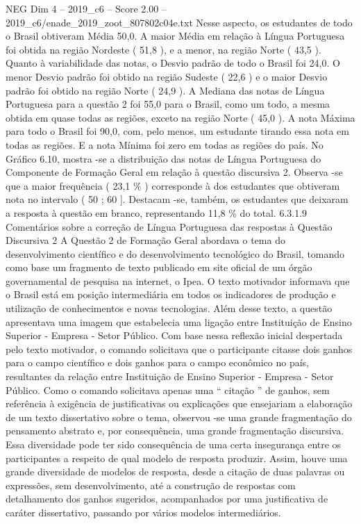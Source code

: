 \begin{textsample}{NEG Dim 4 – 2019\_c6 – Score 2.00 – 2019\_c6/enade\_2019\_zoot\_807802c04e.txt}
Nesse aspecto, os estudantes de todo o Brasil obtiveram Média 50,0.
A maior Média em relação à Língua Portuguesa foi obtida na região Nordeste ( 51,8 ), e a menor, na região Norte ( 43,5 ).
Quanto à variabilidade das notas, o Desvio padrão de todo o Brasil foi 24,0.
O menor Desvio padrão foi obtido na região Sudeste ( 22,6 ) e o maior Desvio padrão foi obtido na região Norte ( 24,9 ).
A Mediana das notas de Língua Portuguesa para a questão 2 foi 55,0 para o Brasil, como um todo, a mesma obtida em quase todas as regiões, exceto na região Norte ( 45,0 ).
A nota Máxima para todo o Brasil foi 90,0, com, pelo menos, um estudante tirando essa nota em todas as regiões.
E a nota Mínima foi zero em todas as regiões do país.
No Gráfico 6.10, mostra -se a distribuição das notas de Língua Portuguesa do Componente de Formação Geral em relação à questão discursiva 2.
Observa -se que a maior frequência ( 23,1 \% ) corresponde à dos estudantes que obtiveram nota no intervalo ( 50 ; 60 ].
Destacam -se, também, os estudantes que deixaram a resposta à questão em branco, representando 11,8 \% do total. 6.3.1.9 Comentários sobre a correção de Língua Portuguesa das respostas à Questão Discursiva 2 A Questão 2 de Formação Geral abordava o tema do desenvolvimento científico e do desenvolvimento tecnológico do Brasil, tomando como base um fragmento de texto publicado em site oficial de um órgão governamental de pesquisa na internet, o Ipea.
O texto motivador informava que o Brasil está em posição intermediária em todos os indicadores de produção e utilização de conhecimentos e novas tecnologias.
Além desse texto, a questão apresentava uma imagem que estabelecia uma ligação entre Instituição de Ensino Superior - Empresa - Setor Público.
Com base nessa reflexão inicial despertada pelo texto motivador, o comando solicitava que o participante citasse dois ganhos para o campo científico e dois ganhos para o campo econômico no país, resultantes da relação entre Instituição de Ensino Superior - Empresa - Setor Público.
Como o comando solicitava apenas uma “ citação ” de ganhos, sem referência à exigência de justificativas ou explicações que ensejariam a elaboração de um texto dissertativo sobre o tema, observou -se uma grande fragmentação do pensamento abstrato e, por consequência, uma grande fragmentação discursiva.
Essa diversidade pode ter sido consequência de uma certa insegurança entre os participantes a respeito de qual modelo de resposta produzir.
Assim, houve uma grande diversidade de modelos de resposta, desde a citação de duas palavras ou expressões, sem desenvolvimento, até a construção de respostas com detalhamento dos ganhos sugeridos, acompanhados por uma justificativa de caráter dissertativo, passando por vários modelos intermediários.

\end{textsample}
